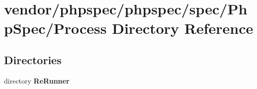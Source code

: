 \section{vendor/phpspec/phpspec/spec/\+Php\+Spec/\+Process Directory Reference}
\label{dir_788955c05cafad91d189898815d35ca1}
\subsection*{Directories}
\begin{DoxyCompactItemize}
\item 
directory {\bf Re\+Runner}
\end{DoxyCompactItemize}
